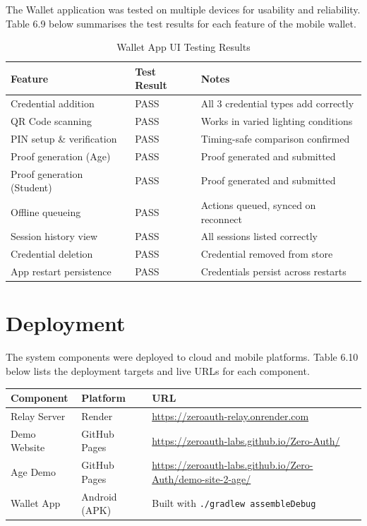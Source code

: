 The Wallet application was tested on multiple devices for usability and reliability. Table 6.9 below summarises the test results for each feature of the mobile wallet.

\begin{table}[H]
\centering
\caption{Wallet App UI Testing Results}
\begin{tabular}{|l|l|l|}
\hline
\textbf{Feature} & \textbf{Test Result} & \textbf{Notes} \\
\hline
Credential addition & PASS & All 3 credential types add correctly \\
QR Code scanning & PASS & Works in varied lighting conditions \\
PIN setup \& verification & PASS & Timing-safe comparison confirmed \\
Proof generation (Age) & PASS & Proof generated and submitted \\
Proof generation (Student) & PASS & Proof generated and submitted \\
Offline queueing & PASS & Actions queued, synced on reconnect \\
Session history view & PASS & All sessions listed correctly \\
Credential deletion & PASS & Credential removed from store \\
App restart persistence & PASS & Credentials persist across restarts \\
\hline
\end{tabular}
\end{table}

\section{Deployment}

The system components were deployed to cloud and mobile platforms. Table 6.10 below lists the deployment targets and live URLs for each component.

\begin{table}[H]
\begin{tabular}{|l|l|l|}
\hline
\textbf{Component} & \textbf{Platform} & \textbf{URL} \\
\hline
Relay Server & Render & \url{https://zeroauth-relay.onrender.com} \\
Demo Website & GitHub Pages & \url{https://zeroauth-labs.github.io/Zero-Auth/} \\
Age Demo & GitHub Pages & \url{https://zeroauth-labs.github.io/Zero-Auth/demo-site-2-age/} \\
Wallet App & Android (APK) & Built with \texttt{./gradlew assembleDebug} \\
\hline
\end{tabular}
\end{table}

